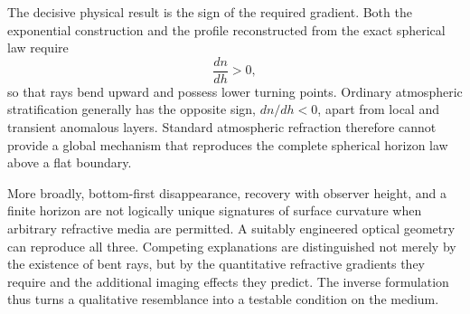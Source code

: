 The decisive physical result is the sign of the required gradient. Both the
exponential construction and the profile reconstructed from the exact
spherical law require
\begin{equation}
    \frac{dn}{dh}>0,
\end{equation}
so that rays bend upward and possess lower turning points. Ordinary
atmospheric stratification generally has the opposite sign, $dn/dh<0$, apart
from local and transient anomalous layers. Standard atmospheric refraction
therefore cannot provide a global mechanism that reproduces the complete
spherical horizon law above a flat boundary.

More broadly, bottom-first disappearance, recovery with observer height, and a
finite horizon are not logically unique signatures of surface curvature when
arbitrary refractive media are permitted. A suitably engineered optical
geometry can reproduce all three. Competing explanations are distinguished
not merely by the existence of bent rays, but by the quantitative refractive
gradients they require and the additional imaging effects they predict.
The inverse formulation thus turns a qualitative resemblance into a testable
condition on the medium.
